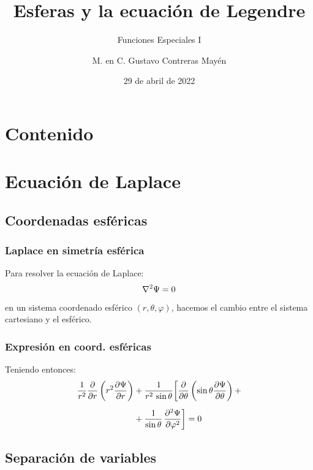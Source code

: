 \documentclass[12pt]{beamer}
\date{29 de abril de 2022}
\title{\large{Esferas y la ecuación de Legendre}}
\subtitle{Funciones Especiales I}
\author{M. en C. Gustavo Contreras Mayén}
\begin{document}
\maketitle
\fontsize{14}{14}\selectfont
{}

\section*{Contenido}

\section{Ecuación de Laplace}
\subsection{Coordenadas esféricas}

\begin{frame}
\frametitle{Laplace en simetría esférica}
Para resolver la ecuación de Laplace:
\pause
\begin{align*}
\laplacian{\Psi} = 0
\end{align*}
en un sistema coordenado esférico $(r, \theta, \varphi)$, hacemos el cambio entre el sistema cartesiano y el esférico.
\end{frame}
\begin{frame}
\frametitle{Expresión en coord. esféricas}
Teniendo entonces:
\pause
\begin{align}
\begin{aligned}[b]
\dfrac{1}{r^{2}} \pdv{r} \left( r^{2} \pdv{\Psi}{r} \right) &+ \dfrac{1}{r^{2} \, \sin \theta} \bigg[ \pdv{\theta} \left( \sin \theta \pdv{\Psi}{\theta} \right) + \\[0.5em]
&+ \dfrac{1}{\sin \theta} \, \pdv[2]{\Psi}{\varphi} \bigg] = 0
\end{aligned}
\label{eq:ecuacion_22_15}
\end{align}
\end{frame}

\subsection{Separación de variables}
\end{document}

